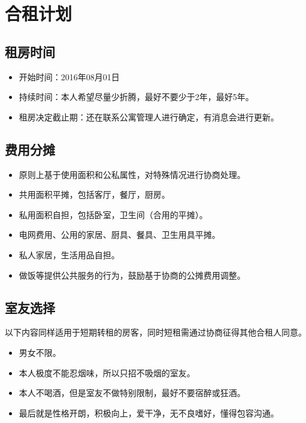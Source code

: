 \documentclass[nofonts,a4paper,11pt]{article}
\begin{document}
\section{合租计划}

\subsection{租房时间}
\begin{itemize}
	\item 开始时间：2016年08月01日
	\item 持续时间：本人希望尽量少折腾，最好不要少于2年，最好5年。
	\item 租房决定截止期：还在联系公寓管理人进行确定，有消息会进行更新。
\end{itemize}

\subsection{费用分摊}
\begin{itemize}
	\item 原则上基于使用面积和公私属性，对特殊情况进行协商处理。
	\item 共用面积平摊，包括客厅，餐厅，厨房。
	\item 私用面积自担，包括卧室，卫生间（合用的平摊）。
	\item 电网费用、公用的家居、厨具、餐具、卫生用具平摊。
	\item 私人家居，生活用品自担。
	\item 做饭等提供公共服务的行为，鼓励基于协商的公摊费用调整。
\end{itemize}

\subsection{室友选择}
以下内容同样适用于短期转租的房客，同时短租需通过协商征得其他合租人同意。
\begin{itemize}
	\item 男女不限。
	\item 本人极度不能忍烟味，所以只招不吸烟的室友。
	\item 本人不喝酒，但是室友不做特别限制，最好不要宿醉或狂酒。
	\item 最后就是性格开朗，积极向上，爱干净，无不良嗜好，懂得包容沟通。
\end{itemize}
\end{document}
